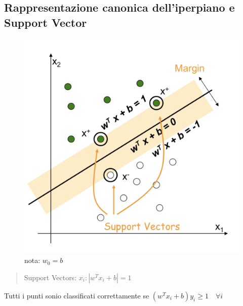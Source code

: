 \documentclass{article}
\begin{document}
\subsection{Rappresentazione canonica dell'iperpiano e Support Vector}
\begin{figure}[H]
\centering
\includegraphics[scale=0.4]{Images/svmmargincanonical.png}
\caption{nota: $w_0=b$}
\end{figure}
\begin{quote}
    Support Vectors: $x_i : |w^Tx_i+b|=1$
\end{quote}
Tutti i punti sonio classificati correttamente se $(w^Tx_i+b)y_i \geq 1 \quad \forall i$
\end{document}
